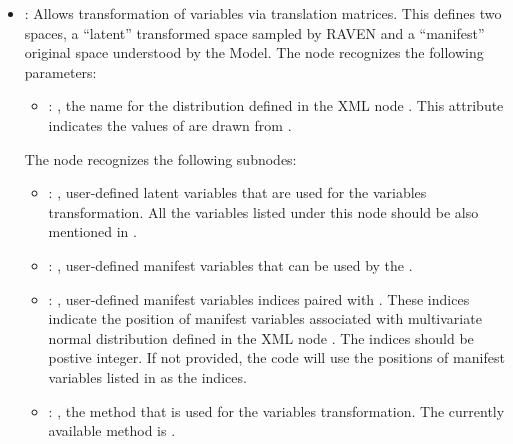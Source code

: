 \begin{itemize}
    \item {}:
      Allows transformation of variables via translation matrices. This defines two spaces,
      a ``latent'' transformed space sampled by RAVEN and a ``manifest'' original space understood
      by the Model.
      The  node recognizes the following parameters:
        \begin{itemize}
          \item {}: , 
            the name for the distribution defined in the XML node .
            This attribute indicates the values of  are drawn from
            .
      \end{itemize}

      The  node recognizes the following subnodes:
      \begin{itemize}
        \item {}: , 
          user-defined latent variables that are used for the variables transformation.
          All the variables listed under this node should be also mentioned in .

        \item {}: , 
          user-defined manifest variables that can be used by the .

        \item {}: , 
          user-defined manifest variables indices paired with .
          These indices indicate the position of manifest variables associated with multivariate
          normal               distribution defined in the XML node .
          The indices should be postive integer. If not provided, the code will use the positions
          of manifest variables listed in  as the indices.

        \item {}: , 
          the method that is used for the variables transformation. The currently available method
          is .
      \end{itemize}
  \end{itemize}

